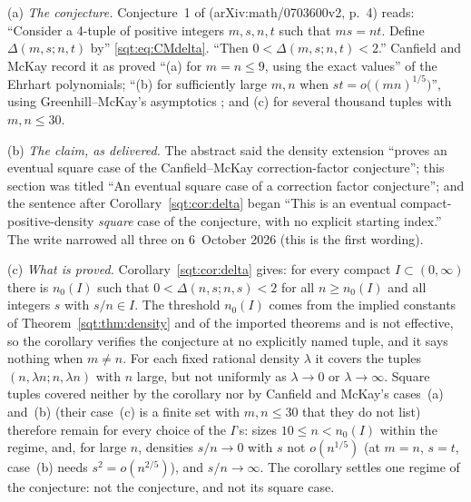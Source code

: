 \begin{remark}\label{sqt:rem:cmregime}
(a) \emph{The conjecture.} Conjecture~1 of \cite{CM} (arXiv:math/0703600v2,
p.~4) reads: ``Consider a 4-tuple of positive integers $m,s,n,t$ such that
$ms=nt$. Define $\Delta(m,s;n,t)$ by'' \eqref{sqt:eq:CMdelta}. ``Then
$0<\Delta(m,s;n,t)<2$.'' Canfield and McKay record it as proved ``(a) for
$m=n\le9$, using the exact values'' of the Ehrhart polynomials; ``(b) for
sufficiently large $m,n$ when $st=o\bigl((mn)^{1/5}\bigr)$'', using
Greenhill--McKay's asymptotics \cite{GM}; and (c) for several thousand
tuples with $m,n\le30$.

(b) \emph{The claim, as delivered.} The abstract said the density extension
``proves an eventual square case of the Canfield--McKay correction-factor
conjecture''; this section was titled ``An eventual square case of a
correction factor conjecture''; and the sentence after
Corollary~\ref{sqt:cor:delta} began ``This is an eventual
compact-positive-density \emph{square} case of the conjecture, with no
explicit starting index.'' The write narrowed all three on 6~October 2026
(this is the first wording).

(c) \emph{What is proved.} Corollary~\ref{sqt:cor:delta} gives: for every
compact $I\subset(0,\infty)$ there is $n_0(I)$ such that
$0<\Delta(n,s;n,s)<2$ for all $n\ge n_0(I)$ and all integers $s$ with
$s/n\in I$. The threshold $n_0(I)$ comes from the implied constants of
Theorem~\ref{sqt:thm:density} and of the imported theorems and is not
effective, so the corollary verifies the conjecture at no explicitly named
tuple, and it says nothing when $m\ne n$. For each fixed rational density
$\lambda$ it covers the tuples $(n,\lambda n;n,\lambda n)$ with $n$ large,
but not uniformly as $\lambda\to0$ or $\lambda\to\infty$. Square tuples
covered neither by the corollary nor by Canfield and McKay's cases~(a)
and~(b) (their case~(c) is a finite set with $m,n\le30$ that they do not
list) therefore remain for every choice of the $I$'s: sizes $10\le
n<n_0(I)$ within the regime, and, for large $n$, densities $s/n\to0$ with $s$
not $o(n^{1/5})$ (at $m=n$, $s=t$, case~(b) needs $s^2=o(n^{2/5})$), and
$s/n\to\infty$. The corollary settles one regime of the conjecture: not the
conjecture, and not its square case.


\end{remark}
